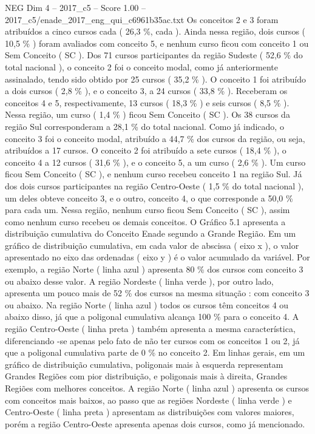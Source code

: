 \begin{textsample}{NEG Dim 4 – 2017\_c5 – Score 1.00 – 2017\_c5/enade\_2017\_eng\_qui\_c6961b35ac.txt}
Os conceitos 2 e 3 foram atribuídos a cinco cursos cada ( 26,3 \%, cada ).
Ainda nessa região, dois cursos ( 10,5 \% ) foram avaliados com conceito 5, e nenhum curso ficou com conceito 1 ou Sem Conceito ( SC ).
Dos 71 cursos participantes da região Sudeste ( 52,6 \% do total nacional ), o conceito 2 foi o conceito modal, como já anteriormente assinalado, tendo sido obtido por 25 cursos ( 35,2 \% ).
O conceito 1 foi atribuído a dois cursos ( 2,8 \% ), e o conceito 3, a 24 cursos ( 33,8 \% ).
Receberam os conceitos 4 e 5, respectivamente, 13 cursos ( 18,3 \% ) e seis cursos ( 8,5 \% ).
Nessa região, um curso ( 1,4 \% ) ficou Sem Conceito ( SC ).
Os 38 cursos da região Sul corresponderam a 28,1 \% do total nacional.
Como já indicado, o conceito 3 foi o conceito modal, atribuído a 44,7 \% dos cursos da região, ou seja, atribuídos a 17 cursos.
O conceito 2 foi atribuído a sete cursos ( 18,4 \% ), o conceito 4 a 12 cursos ( 31,6 \% ), e o conceito 5, a um curso ( 2,6 \% ).
Um curso ficou Sem Conceito ( SC ), e nenhum curso recebeu conceito 1 na região Sul.
Já dos dois cursos participantes na região Centro-Oeste ( 1,5 \% do total nacional ), um deles obteve conceito 3, e o outro, conceito 4, o que corresponde a 50,0 \% para cada um.
Nessa região, nenhum curso ficou Sem Conceito ( SC ), assim como nenhum curso recebeu os demais conceitos.
O Gráfico 5.1 apresenta a distribuição cumulativa do Conceito Enade segundo a Grande Região.
Em um gráfico de distribuição cumulativa, em cada valor de abscissa ( eixo x ), o valor apresentado no eixo das ordenadas ( eixo y ) é o valor acumulado da variável.
Por exemplo, a região Norte ( linha azul ) apresenta 80 \% dos cursos com conceito 3 ou abaixo desse valor.
A região Nordeste ( linha verde ), por outro lado, apresenta um pouco mais de 52 \% dos cursos na mesma situação : com conceito 3 ou abaixo.
Na região Norte ( linha azul ) todos os cursos têm conceitos 4 ou abaixo disso, já que a poligonal cumulativa alcança 100 \% para o conceito 4.
A região Centro-Oeste ( linha preta ) também apresenta a mesma característica, diferenciando -se apenas pelo fato de não ter cursos com os conceitos 1 ou 2, já que a poligonal cumulativa parte de 0 \% no conceito 2.
Em linhas gerais, em um gráfico de distribuição cumulativa, poligonais mais à esquerda representam Grandes Regiões com pior distribuição, e poligonais mais à direita, Grandes Regiões com melhores conceitos.
A região Norte ( linha azul ) apresenta os cursos com conceitos mais baixos, ao passo que as regiões Nordeste ( linha verde ) e Centro-Oeste ( linha preta ) apresentam as distribuições com valores maiores, porém a região Centro-Oeste apresenta apenas dois cursos, como já mencionado.

\end{textsample}
